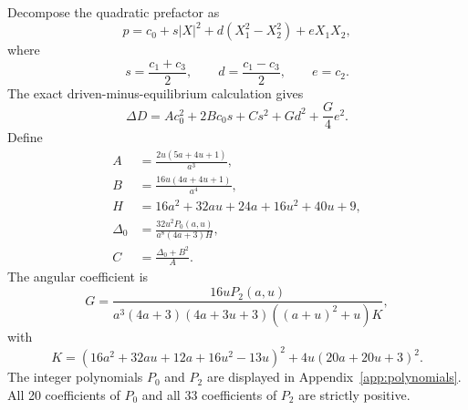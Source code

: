 \documentclass[aps,pre,reprint,amsmath,amssymb,superscriptaddress,nofootinbib]{revtex4-2}
\begin{document}
Decompose the quadratic prefactor as
\begin{equation}
 p=c_0+s|X|^2+d(X_1^2-X_2^2)+eX_1X_2,
\label{eq:p-decomposition}
\end{equation}
where
\begin{equation}
 s=\frac{c_1+c_3}{2},\qquad
 d=\frac{c_1-c_3}{2},\qquad e=c_2.
\end{equation}
The exact driven-minus-equilibrium calculation gives
\begin{equation}
 \Delta D=A c_0^2+2B c_0s+C s^2+Gd^2+\frac{G}{4}e^2.
\label{eq:block-form}
\end{equation}
Define
\begin{subequations}
\label{eq:isotropic-components}
\begin{align}
 A&=\frac{2u(5a+4u+1)}{a^3},\\
 B&=\frac{16u(4a+4u+1)}{a^4},\\
 H&=16a^2+32au+24a+16u^2+40u+9,\\
 \Delta_0&=\frac{32u^2P_0(a,u)}{a^8(4a+3)H},\\
 C&=\frac{\Delta_0+B^2}{A}.
\end{align}
\end{subequations}
The angular coefficient is
\begin{equation}
 G=\frac{16uP_2(a,u)}{
 a^3(4a+3)(4a+3u+3)((a+u)^2+u)K},
\label{eq:angular-coefficient}
\end{equation}
with
\begin{equation}
 K=(16a^2+32au+12a+16u^2-13u)^2
   +4u(20a+20u+3)^2.
\label{eq:K}
\end{equation}
The integer polynomials $P_0$ and $P_2$ are displayed in
Appendix~\ref{app:polynomials}.  All 20 coefficients of $P_0$ and all 33
coefficients of $P_2$ are strictly positive.
\end{document}
